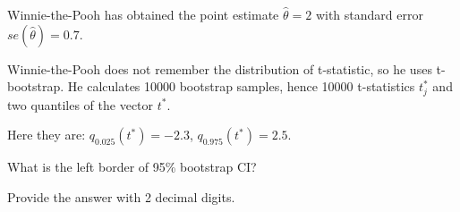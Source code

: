 
\begin{question}
Winnie-the-Pooh has obtained the point estimate \(\hat\theta = 2\)
with standard error \(se(\hat\theta)= 0.7\).

Winnie-the-Pooh does not remember the distribution of t-statistic,
so he uses t-bootstrap.
He calculates 10000 bootstrap samples, hence 10000 t-statistics \(t^*_j\) and
two quantiles of the vector \(t^*\).

Here they are: \(q_{0.025}(t^*) = -2.3\), \(q_{0.975}(t^*)= 2.5\).

What is the left border of 95\% bootstrap CI?

Provide the answer with 2 decimal digits.
\end{question}


